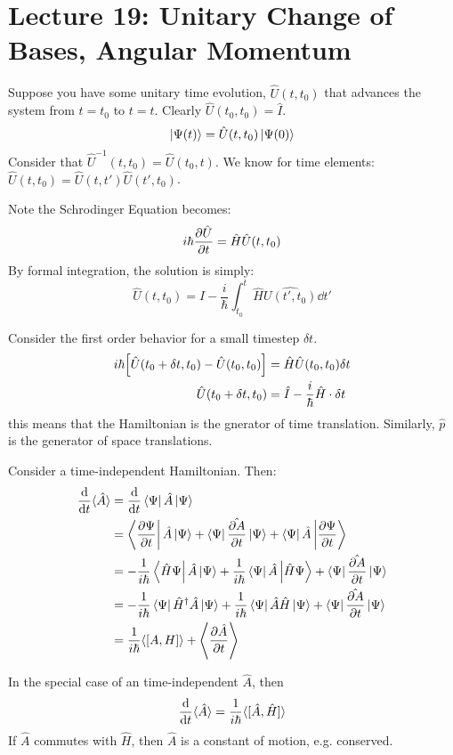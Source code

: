 \section{Lecture 19: Unitary Change of Bases, Angular Momentum}

Suppose you have some unitary time evolution, $\hat{U}(t, t_0)$ that advances the system from $t = t_0$ to $t = t$. Clearly $\hat{U}(t_0, t_0) = \hat{I}$.
\[ \ket{\Psi(t)} = \hat{U}(t, t_0) \ket{\Psi(0)} \]
Consider that $\hat{U}^{-1}(t, t_0) = \hat{U}(t_0, t)$. We know for time elements:
$\hat{U}(t, t_0) = \hat{U}(t, t') \hat{U}(t', t_0)$.

Note the Schrodinger Equation becomes:
\[ i\hbar \partialderivative{\hat{U}}{t}(t, t_0) = \hat{H}\hat{U}(t, t_0) \]
By formal integration, the solution is simply:
\[ \hat{U}(t, t_0) = \hat{I} - \frac{i}{\hbar} \int_{t_0}^t \hat{H}\hat{U(t', t_0)} \dd{t'} \]

Consider the first order behavior for a small timestep $\delta t$.
\begin{align*}
    i\hbar\qty[\hat{U}(t_0 + \delta t, t_0) - \hat{U}(t_0, t_0)] &= \hat{H} \hat{U}(t_0, t_0) \delta t \\
    \hat{U}(t_0 + \delta t, t_0) &= \hat{I} - \frac{i}{\hbar} \hat{H} \cdot \delta t
\end{align*}
this means that the Hamiltonian is the gnerator of time translation. Similarly, $\hat{p}$ is the generator of space translations.

Consider a time-independent Hamiltonian. Then:
\begin{align*}
    \dv{}{t} \langle \hat{A} \rangle &= \dv{}{t} \bra{\Psi} \hat{A} \ket{\Psi} \\
    &= \bra{\pdv{\Psi}{t}} \hat{A} \ket{\Psi} + \bra{\Psi} \hat{\partialderivative{A}{t}} \ket{\Psi} + \bra{\Psi} \hat{A} \ket{\pdv{\Psi}{t}} \\
    &= -\frac{1}{i\hbar} \bra{\hat{H}\Psi} \hat{A} \ket{\Psi} + \frac{1}{i\hbar} \bra{\Psi} \hat{A} \ket{\hat{H}\Psi} + \bra{\Psi}  \hat{\partialderivative{A}{t}} \ket{\Psi} \\
    &= -\frac{1}{i\hbar} \bra{\Psi} \hat{H}^{\dagger} \hat{A} \ket{\Psi} + \frac{1}{i\hbar} \bra{\Psi} \hat{A}\hat{H} \ket{\Psi} + \bra{\Psi}  \hat{\partialderivative{A}{t}} \ket{\Psi} \\
    &= \frac{1}{i\hbar} \langle [A, H] \rangle + \left\langle \pdv{\hat{A}}{t} \right\rangle
\end{align*}

In the special case of an time-independent $\hat{A}$, then
\[ \derivative{}{t}\langle\hat{A}\rangle = \frac{1}{i\hbar} \langle [\hat{A}, \hat{H}] \rangle \]
If $\hat{A}$ commutes with $\hat{H}$, then $\hat{A}$ is a constant of motion, e.g. conserved.

